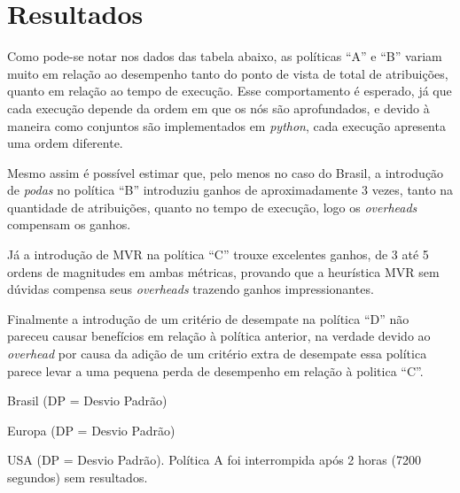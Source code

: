 \documentclass[11pt,towside]{article}
\begin{document}
\section{Resultados}

Como pode-se notar nos dados das tabela abaixo, as políticas ``A'' e ``B'' variam muito em relação ao desempenho tanto do ponto de vista de total de atribuições, quanto em relação ao tempo de execução. Esse comportamento é esperado, já que cada execução depende da ordem em que os nós são aprofundados, e devido à maneira como conjuntos são implementados em \emph{python}, cada execução apresenta uma ordem diferente.

Mesmo assim é possível estimar que, pelo menos no caso do Brasil, a introdução de \emph{podas} no política ``B'' introduziu ganhos de aproximadamente 3 vezes, tanto na quantidade de atribuições, quanto no tempo de execução, logo os \emph{overheads} compensam os ganhos.

Já a introdução de MVR na política ``C'' trouxe excelentes ganhos, de 3 até 5 ordens de magnitudes em ambas métricas, provando que a heurística MVR sem dúvidas compensa seus \emph{overheads} trazendo ganhos impressionantes.

Finalmente a introdução de um critério de desempate na política ``D'' não pareceu causar benefícios em relação à política anterior, na verdade devido ao \emph{overhead} por causa da adição de um critério extra de desempate essa política parece levar a uma
pequena perda de desempenho em relação à politica ``C''. 

\begin{table}[h!]\centering
	\caption{Brasil (DP = Desvio Padrão)}
\end{table}

\begin{table}[h!]\centering
	\caption{Europa (DP = Desvio Padrão)}
\end{table}

\begin{table}[h!]\centering
	\caption{USA (DP = Desvio Padrão). Política A foi interrompida após 2 horas (7200 segundos) sem resultados. }
\end{table}
\end{document}
